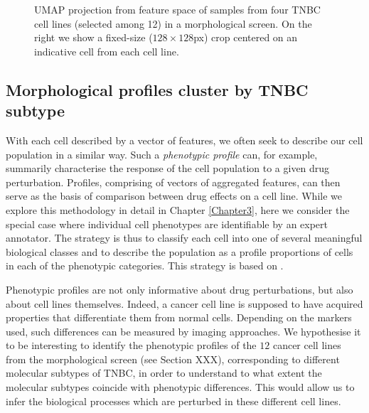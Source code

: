 \begin{figure}
\caption{UMAP projection from feature space of samples from four TNBC cell lines (selected among 12) in a morphological screen. On the right we show a fixed-size ($128\times128$px) crop centered on an indicative cell from each cell line.}
\label{fig:umap_cell_lines}
\end{figure}

\subsection{Morphological profiles cluster by TNBC subtype}
\label{subsec:morphological_profile}

With each cell described by a vector of features, we often seek to describe our cell population in a similar way. Such a \emph{phenotypic profile} can, for example, summarily characterise the response of the cell population to a given drug perturbation. Profiles, comprising of vectors of aggregated features, can then serve as the basis of comparison between drug effects on a cell line. While we explore this methodology in detail in Chapter \ref{Chapter3}, here we consider the special case where individual cell phenotypes are identifiable by an expert annotator. The strategy is thus to classify each cell into one of several meaningful biological classes and to describe the population as a profile proportions of cells in each of the phenotypic categories. This strategy is based on \cite{neumann2010phenotypic}.

Phenotypic profiles are not only informative about drug perturbations, but also about cell lines themselves. Indeed, a cancer cell line is supposed to have acquired properties that differentiate them from normal cells. Depending on the markers used, such differences can be measured by imaging approaches. We hypothesise it to be interesting to identify the phenotypic profiles of the $12$ cancer cell lines from the morphological screen (see Section XXX), corresponding to different molecular subtypes of TNBC, in order to understand to what extent the molecular subtypes coincide with phenotypic differences. This would allow us to infer the biological processes which are perturbed in these different cell lines.

